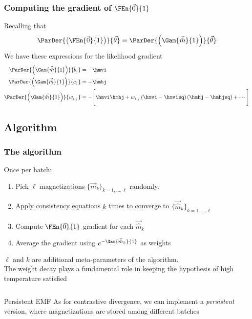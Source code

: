\begin{frame}
  \frametitle{Computing the gradient of \(\FEn{\vec{0}}{1}\)}
  Recalling that
  \[
  \ParDer{\left(\FEn{\vec{0}}{1}\right)}{\vec{\theta}} =
  \ParDer{\left(\Gam{\vec{\hat{m}}}{1}\right)}{\vec{\theta}}
  \]  
  We  have these expressions for the  likelihood gradient
  \begin{align*}
    \ParDer{\left(\Gam{\vec{\hat{m}}}{1}\right)}{b_i} &= -\hmvi\\
    \ParDer{\left(\Gam{\vec{\hat{m}}}{1}\right)}{c_j} &= -\hmhj\\
    \ParDer{\left(\Gam{\vec{\hat{m}}}{1}\right)}{w_{i,j}}
    &=-\Bigg[\hmvi\hmhj +w_{i,j}\left(\hmvi-\hmvisq\right)\left(\hmhj-\hmhjsq\right)+ \cdots \Bigg]
  \end{align*}
\end{frame}


\subsection{Algorithm}
\begin{frame}
  \frametitle{The algorithm}
  Once per batch:
  \begin{enumerate}
    \item Pick \(\ell\) magnetizations \(\{\vec{m}_k\}_{k=1,\dots,\ell}\) randomly.
    \item Apply consistency equations \(k\) times to converge to \(\{\vec{\hat{m}}_k\}_{k=1,\dots,\ell}\)
    \item Compute \(\FEn{\vec{0}}{1}\) gradient for each \(\vec{\hat{m}}_k\)
    \item Average the gradient using \(e^{-\Gam{\vec{\hat{m}}_k}{1}}\) as weights
  \end{enumerate}
	\pause
  \(\ell\) and \(k\) are additional meta-parameters of the algorithm.\\
  \pause
  The \alert{weight decay} plays a fundamental role in keeping  the hypothesis of high temperature satisfied
  \pause
  \begin{columns}
     \begin{alertblock}{Persistent EMF}
       As for contrastive divergence, we can implement a \emph{persistent} version, where magnetizations are stored among different batches
     \end{alertblock}
  \end{columns}
\end{frame}


















